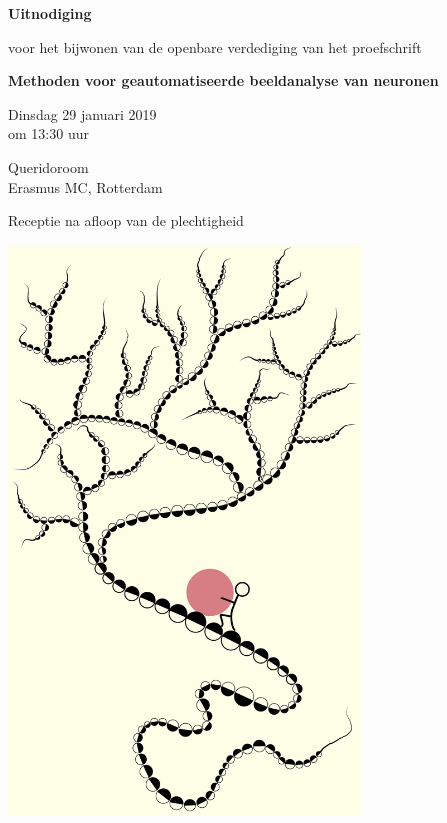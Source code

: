 \documentclass[10pt]{report}
\begin{document}
\pagestyle{empty}
\setlength{\leftmargini}{0em}

\begin{center}
	
  	{\Large\bf Uitnodiging}

  	\bigskip

  	voor het bijwonen van de openbare verdediging van het proefschrift

  	\bigskip
  	\bigskip
	
  
  	{\Large\bf  Methoden voor geautomatiseerde beeldanalyse van neuronen}

  	\bigskip
  	\bigskip
  
  	Dinsdag 29 januari 2019\\om 13:30 uur
  
  	\bigskip
  
  	Queridoroom\\%
  	Erasmus MC, Rotterdam
  
  	\bigskip
  
 	Receptie na afloop van de plechtigheid
  
 	\bigskip

	\includegraphics[width=0.7\textwidth]{syziphus}


\end{center}
\end{document}
